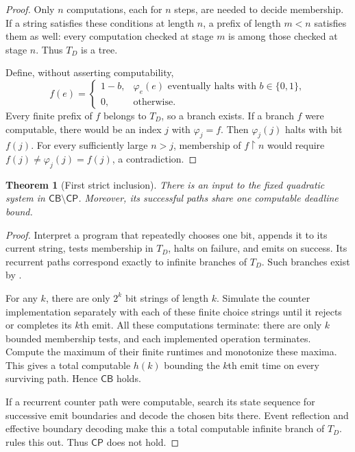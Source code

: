 \documentclass[11pt,letterpaper]{article}
\newtheorem{theorem}{Theorem}[section]
\theoremstyle{definition}
\theoremstyle{remark}
\newcommand{\CP}{\mathsf{CP}}
\newcommand{\CB}{\mathsf{CB}}
\newcommand{\1}{\mathbf 1}
\begin{document}
\begin{proof}
Only $n$ computations, each for $n$ steps, are needed to decide membership.
If a string satisfies these conditions at length $n$, a prefix of length
$m<n$ satisfies them as well: every computation checked at stage $m$ is
among those checked at stage $n$. Thus $T_D$ is a tree.

Define, without asserting computability,
\[
 f(e)=\begin{cases}
 1-b,&\varphi_e(e)\text{ eventually halts with }b\in\{0,1\},\\
 0,&\text{otherwise}.
 \end{cases}
\]
Every finite prefix of $f$ belongs to $T_D$, so a branch exists. If a branch
$f$ were computable, there would be an index $j$ with $\varphi_j=f$.
Then $\varphi_j(j)$ halts with bit $f(j)$. For every sufficiently large
$n>j$, membership of $f\upharpoonright n$ would require
$f(j)\ne\varphi_j(j)=f(j)$, a contradiction.
\end{proof}

\begin{theorem}[First strict inclusion]\label{lbh:qd:thm:cbnotcp}
There is an input to the fixed quadratic system in $\CB\setminus\CP$.
Moreover, its successful paths share one computable deadline bound.
\end{theorem}

\begin{proof}
Interpret a program that repeatedly chooses one bit, appends it to its
current string, tests membership in $T_D$, halts on failure, and emits on
success. Its recurrent paths correspond exactly to infinite branches of
$T_D$. Such branches exist by .

For any $k$, there are only $2^k$ bit strings of length $k$. Simulate the
counter implementation separately with each of these finite choice strings
until it rejects or completes its $k$th emit. All these computations
terminate: there are only $k$ bounded membership tests, and each implemented
operation terminates. Compute the maximum of their finite runtimes and
monotonize these maxima. This gives a total computable $h(k)$ bounding the
$k$th emit time on every surviving path. Hence $\CB$ holds.

If a recurrent counter path were computable, search its state sequence for
successive emit boundaries and decode the chosen bits there. Event
reflection and effective boundary decoding make this a total computable
infinite branch of $T_D$.  rules this out. Thus $\CP$
does not hold.
\end{proof}
\end{document}
